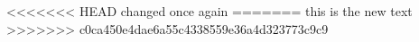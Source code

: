 <<<<<<< HEAD
changed once again
=======
this is the new text
>>>>>>> c0ca450e4dae6a55c4338559e36a4d323773c9c9
